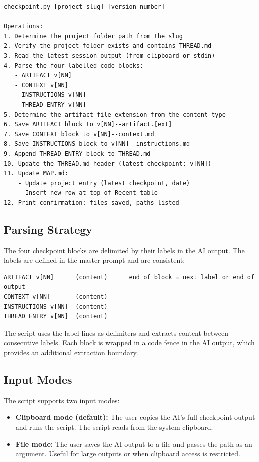 \documentclass[12pt,letterpaper]{article}
\begin{document}
\begin{lstlisting}
checkpoint.py [project-slug] [version-number]

Operations:
1. Determine the project folder path from the slug
2. Verify the project folder exists and contains THREAD.md
3. Read the latest session output (from clipboard or stdin)
4. Parse the four labelled code blocks:
   - ARTIFACT v[NN]
   - CONTEXT v[NN]
   - INSTRUCTIONS v[NN]
   - THREAD ENTRY v[NN]
5. Determine the artifact file extension from the content type
6. Save ARTIFACT block to v[NN]--artifact.[ext]
7. Save CONTEXT block to v[NN]--context.md
8. Save INSTRUCTIONS block to v[NN]--instructions.md
9. Append THREAD ENTRY block to THREAD.md
10. Update the THREAD.md header (latest checkpoint: v[NN])
11. Update MAP.md:
    - Update project entry (latest checkpoint, date)
    - Insert new row at top of Recent table
12. Print confirmation: files saved, paths listed
\end{lstlisting}

\subsection{Parsing Strategy}

The four checkpoint blocks are delimited by their labels in the AI output.
The labels are defined in the master prompt and are consistent:

\begin{lstlisting}
ARTIFACT v[NN]      (content)      end of block = next label or end of output
CONTEXT v[NN]       (content)
INSTRUCTIONS v[NN]  (content)
THREAD ENTRY v[NN]  (content)
\end{lstlisting}

The script uses the label lines as delimiters and extracts content between
consecutive labels. Each block is wrapped in a code fence in the AI output,
which provides an additional extraction boundary.

\subsection{Input Modes}

The script supports two input modes:

\begin{itemize}
  \item \textbf{Clipboard mode (default):} The user copies the AI's full
        checkpoint output and runs the script. The script reads from the
        system clipboard.
  \item \textbf{File mode:} The user saves the AI output to a file and
        passes the path as an argument. Useful for large outputs or
        when clipboard access is restricted.
\end{itemize}
\end{document}
